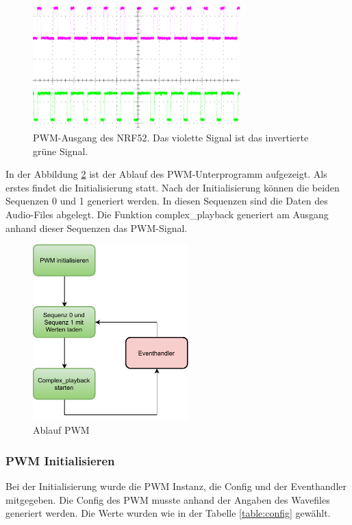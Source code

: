 \begin{figure}[H]
	\begin{center}
		\includegraphics[width=80mm]{data/PWM_Signal_500Hz_Mono}
		\caption[PWM-Ausgang des NRF52]{PWM-Ausgang des NRF52. Das violette Signal ist das invertierte grüne Signal.} %
		\label{fig:pwm_ausgang}
	\end{center}
\end{figure}

In der Abbildung \ref{fig:pwm_ablauf} ist der Ablauf des PWM-Unterprogramm aufgezeigt. Als erstes findet die Initialisierung statt. Nach der Initialisierung können die beiden Sequenzen 0 und 1 generiert werden. In diesen Sequenzen sind die Daten des Audio-Files abgelegt. Die Funktion complex\_playback generiert am Ausgang anhand dieser Sequenzen das PWM-Signal.

\begin{figure}[H]
	\begin{center}
		\includegraphics[width=60mm]{data/pwm_ablauf}
		\caption[Ablauf PWM]{Ablauf PWM} %
		\label{fig:pwm_ablauf}
	\end{center}
\end{figure}

\subsubsection*{PWM Initialisieren}\label{sec:PWM initialisieren}
Bei der Initialisierung wurde die PWM Instanz, die Config und der Eventhandler mitgegeben.  Die Config des PWM musste anhand der Angaben des Wavefiles generiert werden. Die Werte wurden wie in der Tabelle \ref{table:config} gewählt.

